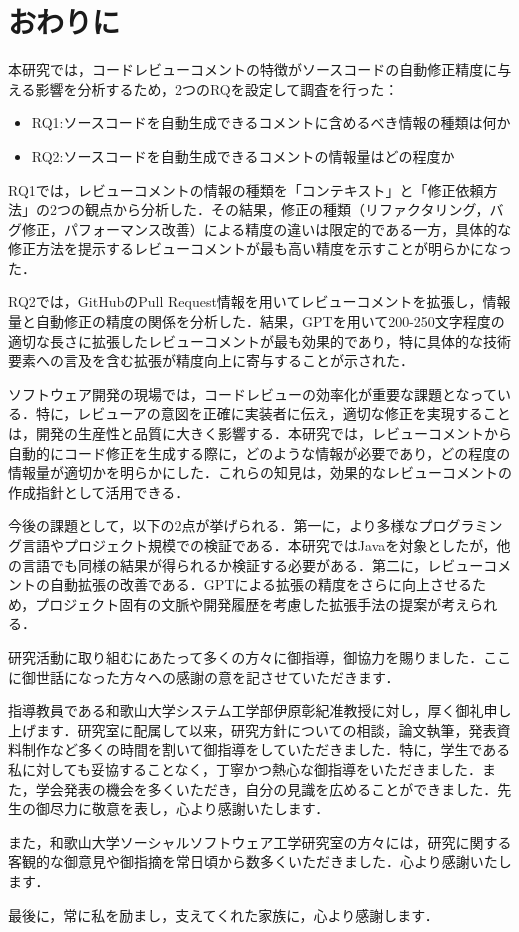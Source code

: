 \documentclass[11pt]{jreport}
\newcommand{\RQone}{ソースコードを自動生成できるコメントに含めるべき情報の種類は何か}
\newcommand{\RQtwo}{ソースコードを自動生成できるコメントの情報量はどの程度か}
\begin{document}
\chapter{おわりに}

本研究では，コードレビューコメントの特徴がソースコードの自動修正精度に与える影響を分析するため，2つのRQを設定して調査を行った：

\begin{itemize}
\item RQ1:\RQone
\item RQ2:\RQtwo
\end{itemize}

RQ1では，レビューコメントの情報の種類を「コンテキスト」と「修正依頼方法」の2つの観点から分析した．その結果，修正の種類（リファクタリング，バグ修正，パフォーマンス改善）による精度の違いは限定的である一方，具体的な修正方法を提示するレビューコメントが最も高い精度を示すことが明らかになった．

RQ2では，GitHubのPull Request情報を用いてレビューコメントを拡張し，情報量と自動修正の精度の関係を分析した．結果，GPTを用いて200-250文字程度の適切な長さに拡張したレビューコメントが最も効果的であり，特に具体的な技術要素への言及を含む拡張が精度向上に寄与することが示された．

ソフトウェア開発の現場では，コードレビューの効率化が重要な課題となっている．特に，レビューアの意図を正確に実装者に伝え，適切な修正を実現することは，開発の生産性と品質に大きく影響する．本研究では，レビューコメントから自動的にコード修正を生成する際に，どのような情報が必要であり，どの程度の情報量が適切かを明らかにした．これらの知見は，効果的なレビューコメントの作成指針として活用できる．

今後の課題として，以下の2点が挙げられる．第一に，より多様なプログラミング言語やプロジェクト規模での検証である．本研究ではJavaを対象としたが，他の言語でも同様の結果が得られるか検証する必要がある．第二に，レビューコメントの自動拡張の改善である．GPTによる拡張の精度をさらに向上させるため，プロジェクト固有の文脈や開発履歴を考慮した拡張手法の提案が考えられる．


\begin{acknowledgements}
研究活動に取り組むにあたって多くの方々に御指導，御協力を賜りました．ここに御世話になった方々への感謝の意を記させていただきます．

指導教員である和歌山大学システム工学部伊原彰紀准教授に対し，厚く御礼申し上げます．研究室に配属して以来，研究方針についての相談，論文執筆，発表資料制作など多くの時間を割いて御指導をしていただきました．特に，学生である私に対しても妥協することなく，丁寧かつ熱心な御指導をいただきました．また，学会発表の機会を多くいただき，自分の見識を広めることができました．先生の御尽力に敬意を表し，心より感謝いたします．

また，和歌山大学ソーシャルソフトウェア工学研究室の方々には，研究に関する客観的な御意見や御指摘を常日頃から数多くいただきました．心より感謝いたします．

最後に，常に私を励まし，支えてくれた家族に，心より感謝します．

\end{acknowledgements}
\end{document}
